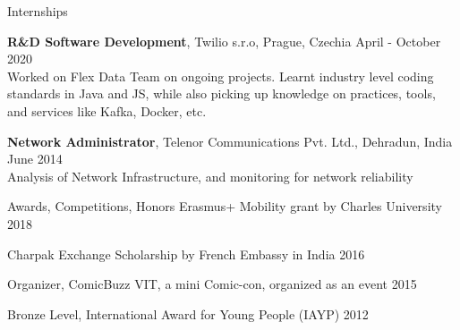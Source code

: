 \documentclass{resume} %
\begin{document}
\begin{rSection}{Internships}

    {\textbf{R\&D Software Development}, Twilio s.r.o, Prague, Czechia} 
        \hfill {April - October 2020}\\
            Worked on Flex Data Team on ongoing projects. Learnt industry level coding 
            standards in Java and JS, while also picking up knowledge on practices, tools, and services like Kafka, Docker, etc.
    
    {\textbf{Network Administrator}, Telenor Communications Pvt. Ltd., Dehradun, India} 
        \hfill {June 2014}\\
            Analysis of Network Infrastructure, and monitoring for network reliability

\end{rSection}




\begin{rSection}{Awards, Competitions, Honors}
    {Erasmus+ Mobility grant by Charles University} \hfill
        {2018}

    {Charpak Exchange Scholarship by French Embassy in India} \hfill
        {2016}

    {Organizer, ComicBuzz VIT, a mini Comic-con, organized as an event} \hfill
        {2015}

    {Bronze Level, International Award for Young People (IAYP)} \hfill
        {2012}
\end{rSection}


\end{document}

